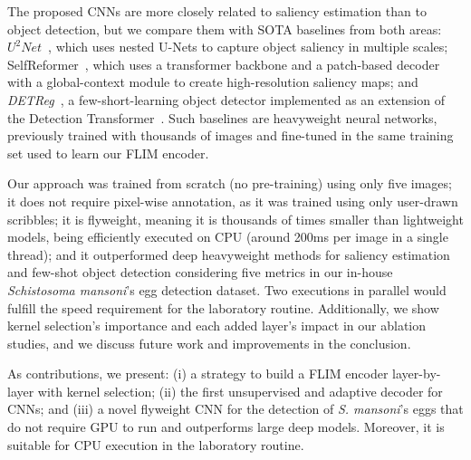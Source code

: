 \documentclass[times,twocolumn,final,authoryear]{elsarticle}
\begin{document}
The proposed CNNs are more closely related to saliency estimation than to object detection, but we compare them with SOTA baselines from both areas: \textit{$U^2Net$}~\cite{qin2020u2}, which uses nested U-Nets to capture object saliency in multiple scales; SelfReformer~\cite{yun2022selfreformer}, which uses a transformer backbone and a patch-based decoder with a global-context module to create high-resolution saliency maps; and  \textit{DETReg}~\cite{bar2021detreg}, a few-short-learning object detector implemented as an extension of the Detection Transformer~\cite{carion2020end}. Such baselines are heavyweight neural networks, previously trained with thousands of images and fine-tuned in the same training set used to learn our FLIM encoder.

Our approach was trained from scratch (no pre-training) using only five images; it does not require pixel-wise annotation, as it was trained using only user-drawn scribbles; it is flyweight, meaning it is thousands of times smaller than lightweight models, being efficiently executed on CPU (around 200ms per image in a single thread); and it outperformed deep heavyweight methods for saliency estimation and few-shot object detection considering five metrics in our in-house \textit{Schistosoma mansoni}'s egg detection dataset. Two executions in parallel would fulfill the speed requirement for the laboratory routine. Additionally, we show kernel selection's importance and each added layer's impact in our ablation studies, and we discuss future work and improvements in the conclusion.

As contributions, we present: (i) a strategy to build a FLIM encoder layer-by-layer with kernel selection; (ii) the first unsupervised and adaptive decoder for CNNs; and (iii) a novel flyweight CNN for the detection of \textit{S. mansoni}'s eggs that do not require GPU to run and outperforms large deep models. Moreover, it is suitable for CPU execution in the laboratory routine. 
\end{document}
